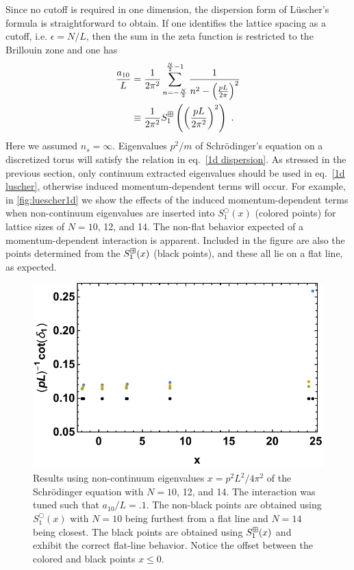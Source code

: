 Since no cutoff is required in one dimension, the dispersion form of L\"uscher's formula is straightforward to obtain.  If one identifies the lattice spacing as a cutoff, i.e. $\epsilon = N/L$, then the sum in the zeta function is restricted to the Brillouin zone and one has
\begin{align}
 \frac{a_{10}}{L} &=\frac{1}{2 \pi^{2}} \sum_{n=-\frac{N}{2}}^{\frac{N}{2}-1} \frac{1}{n^{2}-\left(\frac{p L}{2 \pi}\right)^{2}} \\
 & \equiv \frac{1}{2 \pi^{2}} S^{\boxplus}_{1}\left(\left(\frac{p L}{2 \pi^{2}}\right)^{2}\right)\ .\label{eq:1d dispersion}
 \end{align}
 Here we assumed $n_s=\infty$.  
Eigenvalues $p^2/m$ of Schr\"odinger's equation on a discretized torus will satisfy the relation in eq.~\eqref{1d dispersion}.  As stressed in the previous section, only continuum extracted eigenvalues should be used in eq.~\eqref{1d luscher}, otherwise induced momentum-dependent terms will occur.  For example, in \autoref{fig:luescher1d} we show  the effects of the induced momentum-dependent terms when non-continuum eigenvalues are inserted into $S^\bigcirc_1(x)$ (colored points) for lattice sizes of $N=10$, 12, and 14.  The non-flat behavior expected of a momentum-dependent interaction is apparent.  Included in the figure are also the points determined from the $S^{\boxplus}_1(x)$ (black points), and these all lie on a flat line, as expected.  
\begin{figure}
\center
\includegraphics[width=.6\textwidth]{figure/luescher1d.pdf}
\caption{Results using non-continuum eigenvalues $x=p^2L^2/4\pi^2$ of the Schr\"odinger equation with $N=10$, 12, and 14.  The interaction was tuned such that $a_{10}/L=.1$.  The non-black points are obtained using $S^\bigcirc_1(x)$ with $N=10$ being furthest from a flat line and $N=14$ being closest.  The black points are obtained using $S^{\boxplus}_1(x)$  and exhibit the correct flat-line behavior.  Notice the offset between the colored and black points $x\le 0$.\label{fig:luescher1d}}
\end{figure}
